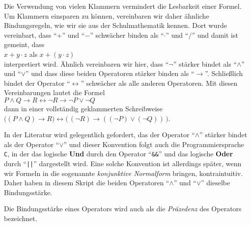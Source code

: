 \begin{enumerate}
      Die Verwendung von vielen Klammern vermindert die Lesbarkeit einer Formel.  Um
      Klammern einsparen zu können, vereinbaren wir daher ähnliche Bindungsregeln, wie wir
      sie aus der Schulmathematik kennen.  Dort wurde vereinbart, dass ``$+$'' und ``$-$'' schwächer
      binden als  ``$\cdot $'' und ``$/$'' und damit ist gemeint, dass \\[0.2cm]
      \hspace*{1.3cm} $x + y \cdot z$  \quad als \quad $x + (y \cdot z)$ \\[0.2cm]
      interpretiert wird.  Ähnlich vereinbaren wir hier, dass ``$\neg$'' stärker bindet als ``$\wedge$''
      und ``$\vee$'' und dass diese beiden Operatoren stärker binden als
      ``$\rightarrow$''.  Schließlich bindet der Operator ``$\leftrightarrow$'' 
      schwächer als alle anderen Operatoren.  Mit diesen Vereinbarungen lautet die Formel \\[0.2cm]
      \hspace*{1.3cm} $P \wedge Q \rightarrow R \leftrightarrow \neg R \rightarrow \neg P \vee \neg Q$ \\[0.2cm]
      dann in einer vollständig geklammerten Schreibweise \\[0.2cm]
      \hspace*{1.3cm}  
      $\bigl((P \wedge Q) \rightarrow R\bigr) \leftrightarrow \bigl(\,(\neg R) \rightarrow ((\neg P) \vee (\neg Q))\,\bigr)$. 
      
      \remark
      In der Literatur wird gelegentlich gefordert, das der Operator ``$\wedge$'' stärker
      bindet als der Operator ``$\vee$'' und dieser Konvention folgt auch die
      Programmiersprache \texttt{C}, in der das logische \textbf{Und} durch den Operator
      ``\texttt{\&\&}'' und das logische \textbf{Oder} durch ``\texttt{||}'' dargestellt wird.
      Eine solche Konvention ist allerdings später, wenn wir Formeln in die sogenannte
      \emph{konjunktive Normalform} bringen, kontraintuitiv.  Daher haben in diesem Skript
      die beiden Operatoren ``$\wedge$'' und ``$\vee$'' dieselbe Bindungsstärke.
      
      \remark
      Die Bindungsstärke eines Operators wird auch als die \emph{Präzedenz} des Operators bezeichnet.


\end{enumerate}
